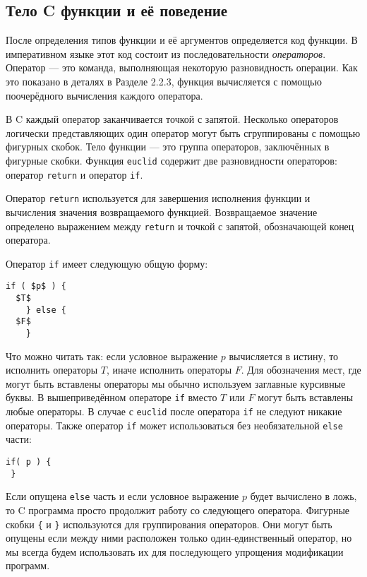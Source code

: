 \subsection{Тело C функции и её поведение}\label{FunctionBodyBehaviour}

После определения типов функции и её аргументов определяется код функции. В императивном языке этот код состоит из последовательности \emph{операторов}. Оператор --- это команда, выполняющая некоторую разновидность операции. Как это показано в деталях в Разделе 2.2.3, функция вычисляется с помощью поочерёдного вычисления каждого оператора.

В C каждый оператор заканчивается точкой с запятой. Несколько операторов логически представляющих один оператор могут быть сгруппированы с помощью фигурных скобок. Тело функции --- это группа операторов, заключённых в фигурные скобки. Функция \lstinline|euclid| содержит две разновидности операторов: оператор \lstinline|return| и оператор \lstinline|if|.

Оператор \lstinline|return| используется для завершения исполнения функции и вычисления значения возвращаемого функцией. Возвращаемое значение определено выражением между \lstinline|return| и точкой с запятой, обозначающей конец оператора.

Оператор \lstinline|if| имеет следующую общую форму:

\begin{lstlisting}
if ( $p$ ) {
  $T$
    } else {
  $F$
    }
\end{lstlisting}

Что можно читать так: если условное выражение $p$ вычисляется в истину, то исполнить операторы $T$, иначе исполнить операторы $F$. Для обозначения мест, где могут быть вставлены операторы мы обычно используем заглавные курсивные буквы. В вышеприведённом операторе \lstinline|if| вместо $T$ или $F$ могут быть вставлены любые операторы. В случае с \lstinline|euclid| после оператора \lstinline|if| не следуют никакие операторы. Также оператор \lstinline|if| может использоваться без необязательной \lstinline|else| части:

\begin{lstlisting}
if( p ) {
 }
\end{lstlisting}

Если опущена \lstinline|else| часть и если условное выражение $p$ будет вычислено в ложь, то C программа просто продолжит работу со следующего оператора. Фигурные скобки \lstinline|{| и \lstinline|}| используются для группирования операторов. Они могут быть опущены если между ними расположен только один-единственный оператор, но мы всегда будем использовать их для последующего упрощения модификации программ. 


